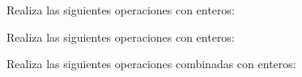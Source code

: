 \documentclass[spanish, 11pt]{exam}
\begin{document}
\begin{questions}
\begin{multicols}{2}
    \end{multicols}

\question[2] Realiza las siguientes operaciones con enteros:
\begin{multicols}{2}
\end{multicols}


\question[2] Realiza las siguientes operaciones con enteros:
\begin{multicols}{2}
\end{multicols}


\question[4] Realiza las siguientes operaciones combinadas con enteros:


\end{questions}
\end{document}
